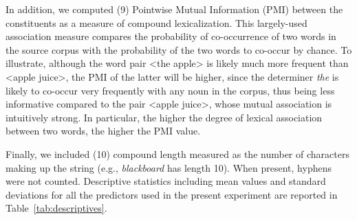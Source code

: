 \documentclass[output=paper]{langsci/langscibook}
\begin{document}
In addition, we computed (9) Pointwise Mutual Information (PMI) between the constituents as a measure of compound lexicalization. This largely-used association measure \citep{church1990} compares the probability of co-occurrence of two words in the source corpus with the probability of the two words to co-occur by chance. To illustrate, although the word pair <the apple> is likely much more frequent than <apple juice>, the PMI of the latter will be higher, since the determiner \emph{the} is likely to co-occur very frequently with any noun in the corpus, thus being less informative compared to the pair <apple juice>, whose mutual association is intuitively strong. In particular, the higher the degree of lexical association between two words, the higher the PMI value.

Finally, we included (10) compound length measured as the number of characters making up the string (e.g., \emph{blackboard} has length 10). When present, hyphens were not counted. Descriptive statistics including mean values and standard deviations for all the predictors used in the present experiment are reported in Table~\ref{tab:descriptives}.
\end{document}
